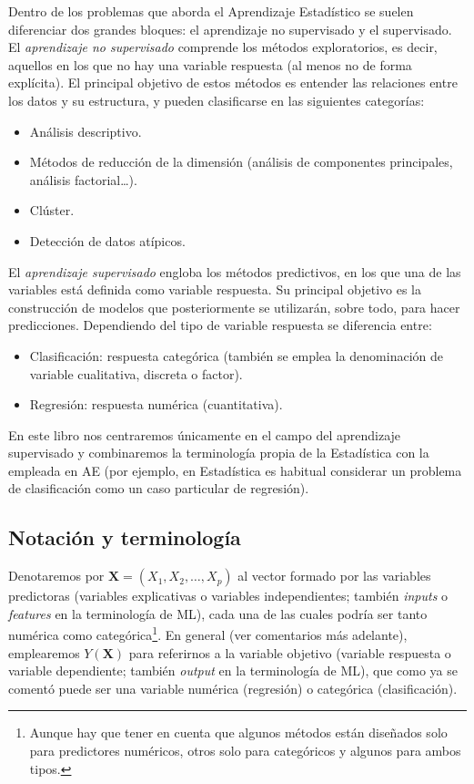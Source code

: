 \documentclass[
]{book}
\theoremstyle{break}
\theoremstyle{nonumberplain}
\begin{document}
Dentro de los problemas que aborda el Aprendizaje Estadístico se suelen diferenciar dos grandes bloques: el aprendizaje no supervisado y el supervisado.
El \emph{aprendizaje no supervisado} comprende los métodos exploratorios, es decir, aquellos en los que no hay una variable respuesta (al menos no de forma explícita).
El principal objetivo de estos métodos es entender las relaciones entre los datos y su estructura, y pueden clasificarse en las siguientes categorías:

\begin{itemize}
\item
  Análisis descriptivo.
\item
  Métodos de reducción de la dimensión (análisis de componentes principales, análisis factorial\ldots).
\item
  Clúster.
\item
  Detección de datos atípicos.
\end{itemize}

El \emph{aprendizaje supervisado} engloba los métodos predictivos, en los que una de las variables está definida como variable respuesta.
Su principal objetivo es la construcción de modelos que posteriormente se utilizarán, sobre todo, para hacer predicciones.
Dependiendo del tipo de variable respuesta se diferencia entre:

\begin{itemize}
\item
  Clasificación: respuesta categórica (también se emplea la denominación de variable cualitativa, discreta o factor).
\item
  Regresión: respuesta numérica (cuantitativa).
\end{itemize}

En este libro nos centraremos únicamente en el campo del aprendizaje supervisado y combinaremos la terminología propia de la Estadística con la empleada en AE (por ejemplo, en Estadística es habitual considerar un problema de clasificación como un caso particular de regresión).

\hypertarget{notacion}{%
\subsection{Notación y terminología}\label{notacion}}

Denotaremos por \(\mathbf{X}=(X_1, X_2, \ldots, X_p)\) al vector formado por las variables predictoras (variables explicativas o variables independientes; también \emph{inputs} o \emph{features} en la terminología de ML), cada una de las cuales podría ser tanto numérica como categórica\footnote{Aunque hay que tener en cuenta que algunos métodos están diseñados solo para predictores numéricos, otros solo para categóricos y algunos para ambos tipos.}.
En general (ver comentarios más adelante), emplearemos \(Y\left(\mathbf{X} \right)\) para referirnos a la variable objetivo (variable respuesta o variable dependiente; también \emph{output} en la terminología de ML), que como ya se comentó puede ser una variable numérica (regresión) o categórica (clasificación).
\end{document}
